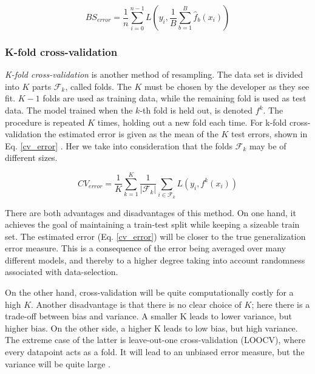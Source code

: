 \begin{equation}\label{bs_error}
    BS_{error} = \frac{1}{n}\sum_{i=0}^{n-1} L\left(y_i,\frac{1}{B}\sum_{b=1}^{B} \hat{f}_b(x_i)\right)
\end{equation}

\subsubsection{K-fold cross-validation}
\textit{K-fold cross-validation} is another method of resampling. 
The data set is divided into $K$ parts $\mathcal{F}_k$, called folds. 
The $K$ must be chosen by the developer as they see fit. 
$K-1$ folds are used as training data, while the remaining fold is used as test data. The model trained when the $k$-th fold is held out, is denoted $f^{k}$. 
The procedure is repeated $K$ times, holding out a new fold each time. For k-fold cross-validation the estimated error is given as the mean of the $K$ test errors, shown in Eq. \ref{cv_error} \citep[p. 241]{hastie}. Her we take into consideration that the folds $\mathcal{F}_k$ may be of different sizes.


\begin{equation}\label{cv_error}
    CV_{error} = \frac{1}{K} \sum_{k=1}^{K} \frac{1}{|\mathcal{F}_k|} \sum_{i \in \mathcal{F}_k} L\left(y_i, f^{k}({x}_i)\right) 
\end{equation}

There are both advantages and disadvantages of this method. On one hand, it achieves the goal of maintaining a train-test split while keeping a sizeable train set. 
The estimated error (Eq. \ref{cv_error}) will be closer to the true generalization error measure. This is a consequence of the error being averaged over many different models, and thereby to a higher degree taking into account randomness associated with data-selection. 

On the other hand, cross-validation will be quite computationally costly for a high $K$. Another disadvantage is that there is no clear choice of $K$; here there is a trade-off between bias and variance. A smaller K leads to lower variance, but higher bias. On the other side, a higher K leads to low bias, but high variance. The extreme case of the latter is leave-out-one cross-validation (LOOCV), where every datapoint acts as a fold. It will lead to an unbiased error measure, but the variance will be quite large \citep[p. 242]{hastie}.



